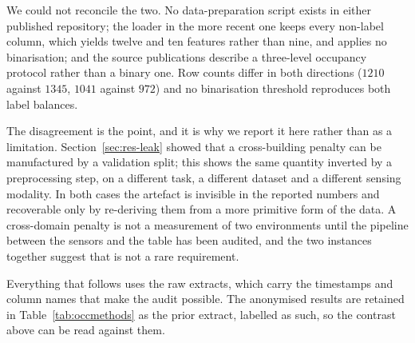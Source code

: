 We could not reconcile the two. No data-preparation script exists in either published
repository; the loader in the more recent one keeps every non-label column, which yields
twelve and ten features rather than nine, and applies no binarisation; and the source
publications describe a three-level occupancy protocol rather than a binary one. Row
counts differ in both directions ($1210$ against $1345$, $1041$ against $972$) and no
binarisation threshold reproduces both label balances.

The disagreement is the point, and it is why we report it here rather than as a
limitation. Section~\ref{sec:res-leak} showed that a cross-building penalty can be
manufactured by a validation split; this shows the same quantity inverted by a
preprocessing step, on a different task, a different dataset and a different sensing
modality. In both cases the artefact is invisible in the reported numbers and recoverable
only by re-deriving them from a more primitive form of the data. A cross-domain penalty is
not a measurement of two environments until the pipeline between the sensors and the
table has been audited, and the two instances together suggest that is not a rare
requirement.

Everything that follows uses the raw extracts, which carry the timestamps and column names
that make the audit possible. The anonymised results are retained in
Table~\ref{tab:occmethods} as the prior extract, labelled as such, so the contrast above
can be read against them.
